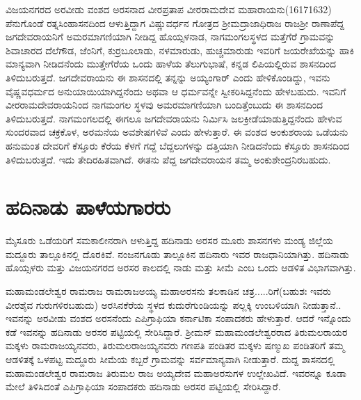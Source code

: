 ವಿಜಯನಗರದ ಅರವೀಡು ವಂಶದ ಅರಸನಾದ ವೀರಪ್ರತಾಪ ವೀರರಾಮದೇವ ಮಹಾರಾಯನು(16171632) ಪೆನುಗೊಂಡೆ ರತ್ನಸಿಂಹಾಸನದಿಂದ ಆಳುತ್ತಿದ್ದಾಗ ವಿಷ್ಣುವರ್ಧನ ಗೋತ್ರದ ಶ‍್ರೀಮದ್ರಾಜಾಧಿರಾಜ ರಾಜಶ‍್ರೀ ರಾಣಾಪೆದ್ದ ಜಗದೇವರಾಯನಿಗೆ ಅಮರಮಾಗಣಿಯಾಗಿ ನೀಡಿದ್ದ ಹೊಯ್ಸಳನಾಡ, ನಾಗಮಂಗಲಸ್ಥಳದ ಮತ್ತೆಗೆರೆ ಗ್ರಾಮವನ್ನು ಶಿವಾಚಾರದ ದೆಲೆಗೌಡ, ಜೆಂನಿಗೆ, ಕುರ್ರಬೂಲಾಡು, ನಳಮಾರುಡು, ಹುಚ್ಚಮಾರುಡು ಇವರಿಗೆ ಜಯರೇಖೆಯನ್ನು ಹಾಕಿ ಮಾನ್ಯವಾಗಿ ನೀಡಿದನೆಂದು ಮುತ್ತೇಗೆರೆಯ ಒಂದು ಹಾಳೆಯ ತೆಲುಗುಭಾಷೆ, ಕನ್ನಡ ಲಿಪಿಯಲ್ಲಿರುವ ಶಾಸನದಿಂದ ತಿಳಿದುಬರುತ್ತದೆ. ಜಗದೇವರಾಯನು ಈ ಶಾಸನದಲ್ಲಿ ತನ್ನನ್ನು ಅಯ್ಯಂಗಾರ್​ ಎಂದು ಹೇಳಿಕೊಂಡಿದ್ದು, ಇವನು ವೈಷ್ಣವಧರ್ಮದ ಅನುಯಾಯಿ\-ಯಾಗಿದ್ದನೆಂದು ಅಥವಾ ಆ ಧರ್ಮವನ್ನೇ ಸ್ವೀಕರಿಸಿದ್ದನೆಂದು ಹೇಳಬಹುದು. ಇವನಿಗೆ ವೀರರಾಮದೇವರಾಯನಿಂದ ನಾಗಮಂಗಲ ಸ್ಥಳವು ಅಮರಮಾಗಣಿಯಾಗಿ ಬಂದಿತ್ತೆಂಬುದು ಈ ಶಾಸನದಿಂದ ತಿಳಿದುಬರುತ್ತದೆ. ನಾಗಮಂಗಲದಲ್ಲಿ ಈಗಲೂ ಜಗದೇವರಾಯನು ನಿರ್ಮಿಸಿ ಜಲಕ್ರೀಡೆಯಾಡುತ್ತಿದ್ದನೆಂದು ಹೇಳುವ ಸುಂದರವಾದ ಚಕ್ರಕೊಳ, ಅರಮನೆಯ ಅವಶೇಷಗಳಿವೆ ಎಂದು ಹೇಳುತ್ತಾರೆ. ಈ ವಂಶದ ಅಂಕುಶರಾಯ ಒಡೆಯನು ಹನುಮಂತ ದೇವರಿಗೆ ಕೆಸ್ತೂರು ಕೆರೆಯ ಕೆಳಗೆ ಗದ್ದೆ ಬೆದ್ದಲುಗಳನ್ನು ದತ್ತಿಯಾಗಿ ನೀಡಿದನೆಂದು ಕೆಸ್ತೂರು ಶಾಸನದಿಂದ ತಿಳಿದುಬರುತ್ತದೆ. ಇದು ತೇದಿರಹಿತವಾಗಿದೆ. ಈತನು ಪೆದ್ದ ಜಗದೇವರಾಯನ ತಮ್ಮ ಅಂಕುಶೇಂದ್ರನಿರಬಹುದು.


\section{ಹದಿನಾಡು ಪಾಳೆಯಗಾರರು}

ಮೈಸೂರು ಒಡೆಯರಿಗೆ ಸಮಕಾಲೀನರಾಗಿ ಆಳುತ್ತಿದ್ದ ಹದಿನಾಡು ಅರಸರ ಮೂರು ಶಾಸನಗಳು ಮಂಡ್ಯ ಜಿಲ್ಲೆಯ ಮದ್ದೂರು ತಾಲ್ಲೂಕಿನಲ್ಲಿ ದೊರಕಿವೆ. ನಂಜನಗೂಡು ತಾಲ್ಲೂಕಿನ ಹದಿನಾರು ಇವರ ರಾಜಧಾನಿಯಾಗಿತ್ತು. ಹದಿನಾಡು ಹೊಯ್ಸಳರು ಮತ್ತು ವಿಜಯನಗರದ ಅರಸರ ಕಾಲದಲ್ಲಿ ನಾಡು ಮತ್ತು ಸೀಮೆ ಎಂಬ ಒಂದು ಆಡಳಿತ ವಿಭಾಗವಾಗಿತ್ತು.

ಮಹಾಮಂಡಲೇಶ್ವರ ರಾಮರಾಜ ರಾಮರಾಜಅಯ್ಯ ಮಹಾಅರಸನು ತಲಕಾಡಿನ ಚತ್ರ.....ರಿಗೆ(ಬಹುಶಃ ಇವರು ವೀರಶೈವ ಗುರುಗಳಿರಬಹುದು) ಅರಸಿನಕೆರೆಯ ಸ್ಥಳದ ಕುದುರೆಗುಂಡಿಯನ್ನು ಪಲ್ಲಕ್ಕಿ ಉಂಬಳಿಯಾಗಿ ನೀಡುತ್ತಾನೆ.. ಇವನನ್ನು ಅರವೀಡು ವಂಶದ ಅರಸನೆಂದು ಎಪಿಗ್ರಾಫಿಯಾ ಕರ್ನಾಟಿಕಾ ಸಂಪಾದಕರು ಹೇಳುತ್ತಾರೆ. ಆದರೆ ಇನ್ನೊಂದು ಕಡೆ ಇವನನ್ನು ಹದಿನಾಡು ಅರಸರ ಪಟ್ಟಿಯಲ್ಲಿ ಸೇರಿಸಿದ್ದಾರೆ. ಶ‍್ರೀಮನ್​ ಮಹಾಮಂಡಲೇಶ್ವರರಾದ ತಿರುಮಲರಾಯರ ಮಕ್ಕಳು ರಾಮರಾಜಯ್ಯನವರು, ತಿರುಮಲರಾಜಯ್ಯನವರು ಗಣಪತಿ ಪಂಡಿತರ ಮಕ್ಕಳು ಷಣ್ಮುಖ ಪಂಡಿತರಿಗೆ ತಮ್ಮ ಆಡಳಿತಕ್ಕೆ ಒಳಪಟ್ಟ ಮದ್ದೂರು ಸೀಮೆಯ ಕಬ್ಬರೆ ಗ್ರಾಮವನ್ನು ಸರ್ವಮಾನ್ಯವಾಗಿ ನೀಡುತ್ತಾರೆ. ದುದ್ದ ಶಾಸನದಲ್ಲಿ ಮಹಾಮಂಡಲೇಶ್ವರ ರಾಮರಾಜ ತಿರುಮಲ ರಾಜ ಅಯ್ಯದೇವ ಮಹಾಅರಸುಗಳ ಉಲ್ಲೇಖವಿದೆ. ಇವರನ್ನೂ ಕೂಡಾ ಮೇಲೆ ತಿಳಿಸಿದಂತೆ ಎಪಿಗ್ರಾಫಿಯಾ ಸಂಪಾದಕರು ಹದಿನಾಡು ಅರಸರ ಪಟ್ಟಿಯಲ್ಲಿ ಸೇರಿಸಿದ್ದಾರೆ.

